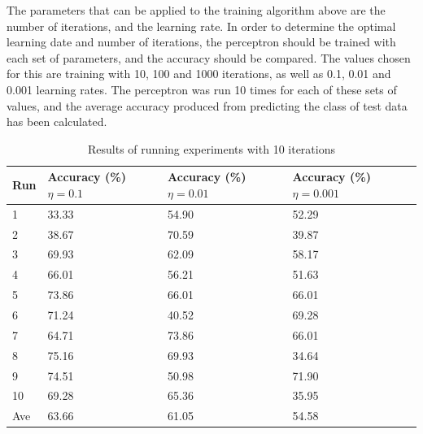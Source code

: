 \documentclass[10pt,twocolumn,a4paper]{article}
\begin{document}
The parameters that can be applied to the training algorithm above are the number of iterations, and the learning rate. In order to determine the optimal learning date and number of iterations, the perceptron should be trained with each set of parameters, and the accuracy should be compared. The values chosen for this are training with 10, 100 and 1000 iterations, as well as 0.1, 0.01 and 0.001 learning rates. The perceptron was run 10 times for each of these sets of values, and the average accuracy produced from predicting the class of test data has been calculated.

\begin{table}[h!]
\begin{center}
\begin{tabular}{ |p{2em}|p{5em}|p{5em}|p{5em}| } 
\hline
Run & Accuracy (\%) $\eta=0.1$ & Accuracy (\%) $\eta=0.01$ & Accuracy (\%) $\eta=0.001$\\
\hline
1 & 33.33 & 54.90 & 52.29 \\
2 & 38.67 & 70.59 & 39.87\\
3 & 69.93	& 62.09 & 58.17 \\
4 & 66.01	& 56.21 & 51.63 \\
5 & 73.86	& 66.01 & 66.01 \\
6 & 71.24	& 40.52 & 69.28 \\
7 & 64.71	& 73.86 & 66.01 \\
8 & 75.16	& 69.93 & 34.64 \\
9 & 74.51	& 50.98 & 71.90 \\
10 & 69.28	& 65.36 & 35.95 \\
\hline
Ave & 63.66	& 61.05 & 54.58 \\
\hline
\end{tabular}
\caption{Results of running experiments with 10 iterations}
\label{table:10iterations}
\end{center}
\end{table}
\end{document}
